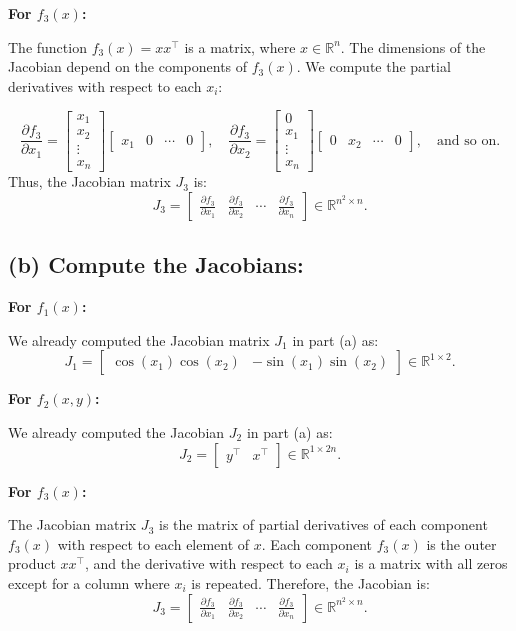 \documentclass[12pt]{article}
\begin{document}
\textbf{For \( f_3(x) \):}

The function \( f_3(x) = xx^\top \) is a matrix, where \( x \in \mathbb{R}^n \). The dimensions of the Jacobian depend on the components of \( f_3(x) \). We compute the partial derivatives with respect to each \( x_i \):

\[
\frac{\partial f_3}{\partial x_1} = \begin{bmatrix} x_1 \\ x_2 \\ \vdots \\ x_n \end{bmatrix} \begin{bmatrix} x_1 & 0 & \cdots & 0 \end{bmatrix}, \quad \frac{\partial f_3}{\partial x_2} = \begin{bmatrix} 0 \\ x_1 \\ \vdots \\ x_n \end{bmatrix} \begin{bmatrix} 0 & x_2 & \cdots & 0 \end{bmatrix}, \quad \text{and so on.}
\]
Thus, the Jacobian matrix \( J_3 \) is:
\[
J_3 = \begin{bmatrix} \frac{\partial f_3}{\partial x_1} & \frac{\partial f_3}{\partial x_2} & \cdots & \frac{\partial f_3}{\partial x_n} \end{bmatrix} \in \mathbb{R}^{n^2 \times n}.
\]

\subsection*{(b) Compute the Jacobians:}

\textbf{For \( f_1(x) \):}

We already computed the Jacobian matrix \( J_1 \) in part (a) as:
\[
J_1 = \begin{bmatrix} \cos(x_1) \cos(x_2) & -\sin(x_1) \sin(x_2) \end{bmatrix} \in \mathbb{R}^{1 \times 2}.
\]

\textbf{For \( f_2(x, y) \):}

We already computed the Jacobian \( J_2 \) in part (a) as:
\[
J_2 = \begin{bmatrix} y^\top & x^\top \end{bmatrix} \in \mathbb{R}^{1 \times 2n}.
\]

\textbf{For \( f_3(x) \):}

The Jacobian matrix \( J_3 \) is the matrix of partial derivatives of each component \( f_3(x) \) with respect to each element of \( x \). Each component \( f_3(x) \) is the outer product \( xx^\top \), and the derivative with respect to each \( x_i \) is a matrix with all zeros except for a column where \( x_i \) is repeated. Therefore, the Jacobian is:
\[
J_3 = \begin{bmatrix} \frac{\partial f_3}{\partial x_1} & \frac{\partial f_3}{\partial x_2} & \cdots & \frac{\partial f_3}{\partial x_n} \end{bmatrix} \in \mathbb{R}^{n^2 \times n}.
\]
\end{document}
